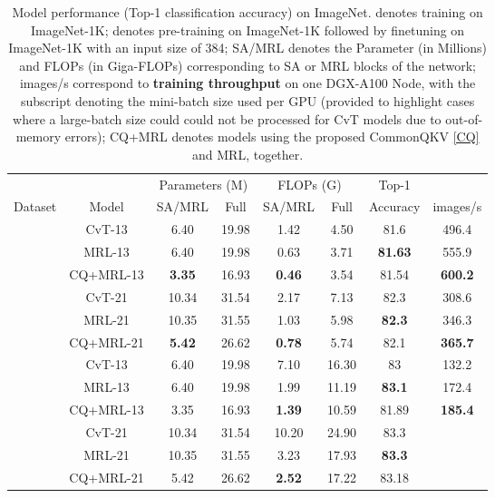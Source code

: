 \documentclass{article}
\begin{document}
\begin{table}[htbp]
  \centering
  \caption{Model performance (Top-1 classification accuracy) on ImageNet.  denotes training on ImageNet-1K; {\selectfont } denotes pre-training on ImageNet-1K followed by finetuning on ImageNet-1K with an input size of 384; {\selectfont SA/MRL} denotes the Parameter (in Millions) and FLOPs (in Giga-FLOPs) corresponding to SA or MRL blocks of the network; {\selectfont  images/s} correspond to \textbf{training throughput} on one DGX-A100 Node, with the subscript denoting the mini-batch size used per GPU (provided to highlight cases where a large-batch size could could not be processed for CvT models due to out-of-memory errors); {\selectfont CQ+MRL} denotes models using the proposed CommonQKV \ref{CQ} and MRL, together.} \label{table:ImagentresultsAppendix}
    \begin{tabular}{c|l|cc|cc|c|c}
    \toprule
    \multicolumn{1}{c}{} &       & \multicolumn{2}{c|}{Parameters (M)} & \multicolumn{2}{c|}{FLOPs (G)} & \multicolumn{1}{c}{Top-1} & \\
    \multicolumn{1}{c|}{Dataset} & \multicolumn{1}{c|}{Model} & SA/MRL & Full  & SA/MRL & Full  & \multicolumn{1}{c|}{Accuracy} & images/s \\
    \midrule
    \multirow{6}[4]{*}{} & \multicolumn{1}{c|}{CvT-13} & 6.40  & 19.98 & 1.42  & 4.50  & 81.6  & 496.4 \\
          & \multicolumn{1}{c|}{MRL-13} & 6.40  & 19.98 & 0.63  & 3.71  & \textbf{81.63} & 555.9 \\
          & \multicolumn{1}{c|}{CQ+MRL-13} & \textbf{3.35} & 16.93 & \textbf{0.46} & 3.54  & 81.54 & \textbf{600.2} \\
\cmidrule{2-8}          & \multicolumn{1}{c|}{CvT-21} & 10.34 & 31.54 & 2.17  & 7.13  & 82.3  & 308.6 \\
          & \multicolumn{1}{c|}{MRL-21} & 10.35 & 31.55 & 1.03  & 5.98  & \textbf{82.3} & 346.3 \\
          & \multicolumn{1}{c|}{CQ+MRL-21} & \textbf{5.42} & 26.62 & \textbf{0.78} & 5.74  & 82.1  & \textbf{365.7} \\
    \midrule
    \multirow{6}[3]{*}{} & \multicolumn{1}{c|}{CvT-13} & 6.40  & 19.98 & 7.10  & 16.30 & 83    & 132.2 \\
          & \multicolumn{1}{c|}{MRL-13} & 6.40  & 19.98 & 1.99 & 11.19 & \textbf{83.1} & 172.4 \\
          & \multicolumn{1}{c|}{CQ+MRL-13} & 3.35  & 16.93 & \textbf{1.39}  & 10.59 & 81.89 & \textbf{185.4} \\
\cmidrule{2-8}          & \multicolumn{1}{c|}{CvT-21} & 10.34 & 31.54 & 10.20 & 24.90 & 83.3  &  \\
          & \multicolumn{1}{c|}{MRL-21} & 10.35 & 31.55 & 3.23  & 17.93 & \textbf{83.3} &  \\
          & CQ+MRL-21 & 5.42  & 26.62 & \textbf{2.52} & 17.22 & 83.18 & \boldmath{}\textbf{}\unboldmath{} \\
    \end{tabular}\end{table}
\end{document}
